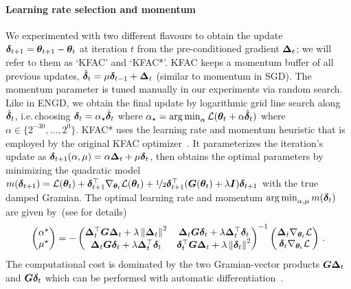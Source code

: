 \paragraph{Learning rate selection and momentum}
We experimented with two different flavours to obtain the update ${\bm{\delta}}_{t+1} = {\bm{\theta}}_{t+1} - {\bm{\theta}}_t$ at iteration $t$ from the pre-conditioned gradient ${\bm{\Delta}}_t$; we will refer to them as `KFAC' and `KFAC*'.
KFAC keeps a momentum buffer of all previous updates, $\hat{{\bm{\delta}}}_t = \mu {\bm{\delta}}_{t-1} + {\bm{\Delta}}_t$ (similar to momentum in SGD).
The momentum parameter is tuned manually in our experiments via random search.
Like in ENGD, we obtain the final update by logarithmic grid line search along $\hat{{\bm{\delta}}}_t$, i.e.\,choosing ${\bm{\delta}}_t = \alpha_{\star} \hat{{\bm{\delta}}}_t$ where $\alpha_{\star} = \operatorname*{arg\,min}_{\alpha} {\mathcal{L}}({\bm{\theta}}_t + \alpha \hat{{\bm{\delta}}}_t)$ where $\alpha \in \{2^{-30}, \dots, 2^0\}$.
KFAC* uses the learning rate and momentum heuristic that is employed by the original KFAC optimizer~\cite{martens2015optimizing}.
It parameterizes the iteration's update as ${\bm{\delta}}_{t+1}(\alpha, \mu) = \alpha {\bm{\Delta}}_t + \mu {\bm{\delta}}_t$, then obtains the optimal parameters by minimizing the quadratic model $m({\bm{\delta}}_{t+1}) = {\mathcal{L}}({\bm{\theta}}_t) + {\bm{\delta}}_{t+1}^{\top} \nabla_{{\bm{\theta}}_t}{\mathcal{L}}({\bm{\theta}}_t) + \nicefrac{1}{2}{\bm{\delta}}_{t+1}^{\top} ({\bm{G}}({\bm{\theta}}_t) + \lambda {\bm{I}}) {\bm{\delta}}_{t+1}$ with the true damped Gramian.
The optimal learning rate and momentum $\operatorname*{arg\,min}_{\alpha, \mu} m({\bm{\delta}}_t)$ are given by~(see \citep[][Section 7]{martens2015optimizing} for details)
\begin{align}
  \begin{pmatrix}
    \alpha^{\star} \\ \mu^{\star}
  \end{pmatrix}
  =
  -
  \begin{pmatrix}
    {\bm{\Delta}}_t^{\top} {\bm{G}} {\bm{\Delta}}_t + \lambda \left\lVert {\bm{\Delta}}_t \right\rVert^2
    & {\bm{\Delta}}_t {\bm{G}} {\bm{\delta}}_t + \lambda {\bm{\Delta}}^{\top}_t {\bm{\delta}}_t
    \\
    {\bm{\Delta}}_t {\bm{G}} {\bm{\delta}}_t + \lambda {\bm{\Delta}}^{\top}_t {\bm{\delta}}_t
    &
      {\bm{\delta}}_t^{\top} {\bm{G}} {\bm{\Delta}}_t + \lambda \left\lVert {\bm{\delta}}_t \right\rVert^2
  \end{pmatrix}^{-1}
  \begin{pmatrix}
    {\bm{\Delta}}_t \nabla_{{\bm{\theta}}_t} {\mathcal{L}}
    \\
    {\bm{\delta}}_t \nabla_{{\bm{\theta}}_t} {\mathcal{L}}
  \end{pmatrix}\,.
\end{align}
The computational cost is dominated by the two Gramian-vector products ${\bm{G}} {\bm{\Delta}}_t$ and ${\bm{G}} {\bm{\delta}}_t$ which can be performed with automatic differentiation~\citep{pearlmutter1994fast,schraudolph2002fast}. 
